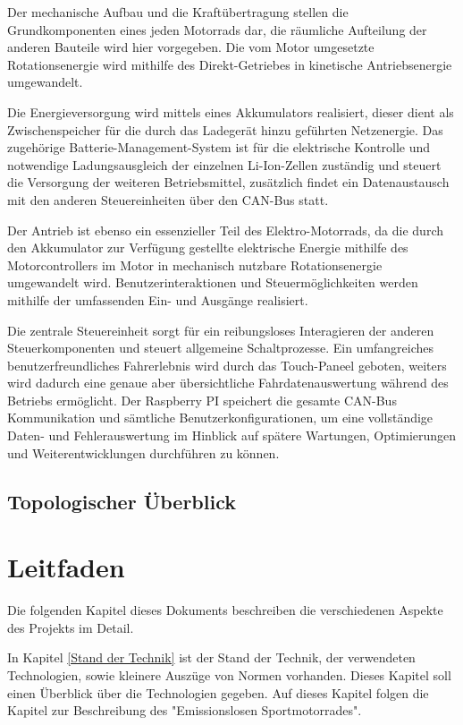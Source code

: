 Der mechanische Aufbau und die Kraftübertragung stellen die Grundkomponenten eines jeden Motorrads dar, die räumliche Aufteilung der anderen Bauteile wird hier vorgegeben. Die vom Motor umgesetzte Rotationsenergie wird mithilfe des Direkt-Getriebes in kinetische Antriebsenergie umgewandelt.

Die Energieversorgung wird mittels eines Akkumulators realisiert, dieser dient als Zwischenspeicher für die durch das Ladegerät hinzu geführten Netzenergie. Das zugehörige Batterie-Management-System ist für die elektrische Kontrolle und notwendige Ladungsausgleich der einzelnen Li-Ion-Zellen zuständig und steuert die Versorgung der weiteren Betriebsmittel, zusätzlich findet ein Datenaustausch mit den anderen Steuereinheiten über den CAN-Bus statt.

Der Antrieb ist ebenso ein essenzieller Teil des Elektro-Motorrads, da die durch den Akkumulator zur Verfügung gestellte elektrische Energie mithilfe des Motorcontrollers im Motor in mechanisch nutzbare Rotationsenergie umgewandelt wird. Benutzerinteraktionen und Steuermöglichkeiten werden mithilfe der umfassenden Ein- und Ausgänge realisiert.

Die zentrale Steuereinheit sorgt für ein reibungsloses Interagieren der anderen Steuerkomponenten und steuert allgemeine Schaltprozesse. Ein umfangreiches benutzerfreundliches Fahrerlebnis wird durch das Touch-Paneel geboten, weiters wird dadurch eine genaue aber übersichtliche Fahrdatenauswertung während des Betriebs ermöglicht. Der Raspberry PI speichert die gesamte CAN-Bus Kommunikation und sämtliche Benutzerkonfigurationen, um eine vollständige Daten- und Fehlerauswertung im Hinblick auf spätere Wartungen, Optimierungen und Weiterentwicklungen durchführen zu können.

\subsection{Topologischer Überblick}

\newpage

\section{Leitfaden}

Die folgenden Kapitel dieses Dokuments beschreiben die verschiedenen Aspekte des Projekts im Detail. 

In Kapitel \ref{Stand der Technik} ist der Stand der Technik, der verwendeten Technologien, sowie kleinere Auszüge von Normen vorhanden. Dieses Kapitel soll einen Überblick über die Technologien gegeben. Auf dieses Kapitel folgen die Kapitel zur Beschreibung des "Emissionslosen Sportmotorrades". 

